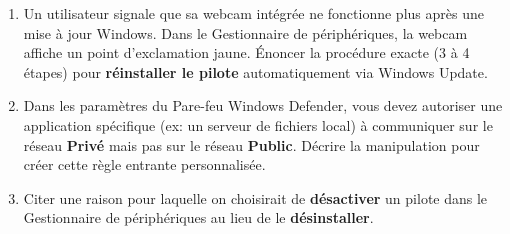 \documentclass[11pt]{article}
\begin{document}
\begin{exercice}
\begin{enumerate}
    \item Un utilisateur signale que sa webcam intégrée ne fonctionne plus après une mise à jour Windows. Dans le Gestionnaire de périphériques, la webcam affiche un point d'exclamation jaune. Énoncer la procédure exacte (3 à 4 étapes) pour \textbf{réinstaller le pilote} automatiquement via Windows Update.
    \item Dans les paramètres du Pare-feu Windows Defender, vous devez autoriser une application spécifique (ex: un serveur de fichiers local) à communiquer sur le réseau \textbf{Privé} mais pas sur le réseau \textbf{Public}. Décrire la manipulation pour créer cette règle entrante personnalisée.
    \item Citer une raison pour laquelle on choisirait de \textbf{désactiver} un pilote dans le Gestionnaire de périphériques au lieu de le \textbf{désinstaller}.
\end{enumerate}
\end{exercice}
\end{document}
